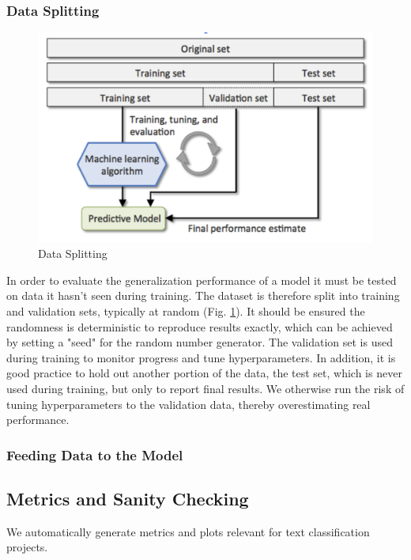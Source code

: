 \subsubsection{Data Splitting}
\begin{figure}[h]
    \includegraphics[width=\linewidth]{chapters/NLP/figures/data_splitting.png}
    \caption{Data Splitting}
    \label{fig:data_splitting}
\end{figure}
In order to evaluate the generalization performance of a model it must be tested on data it hasn't seen during training.
The dataset is therefore split into training and validation sets, typically at random (Fig. \ref{fig:data_splitting}).
It should be ensured the randomness is deterministic to reproduce results exactly, which can be achieved by setting a "seed" for the random number generator.
The validation set is used during training to monitor progress and tune hyperparameters.
In addition, it is good practice to hold out another portion of the data, the test set, which is never used during training, but only to report final results.
We otherwise run the risk of tuning hyperparameters to the validation data, thereby overestimating real performance.
\subsubsection{Feeding Data to the Model}

\subsection{Metrics and Sanity Checking}
\label{metrics_and_sanity_checking}
We automatically generate metrics and plots relevant for text classification projects.
